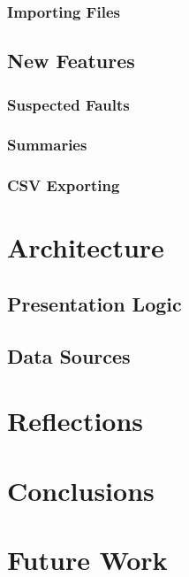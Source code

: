 \documentclass{article}
\begin{document}
\subsubsection{Importing Files}


\subsection{New Features}
\subsubsection{Suspected Faults}
\subsubsection{Summaries}
\subsubsection{CSV Exporting}

\section{Architecture}
\subsection{Presentation Logic}
\subsection{Data Sources}
\section{Reflections}
\section{Conclusions}

\section{Future Work}



\end{document}

